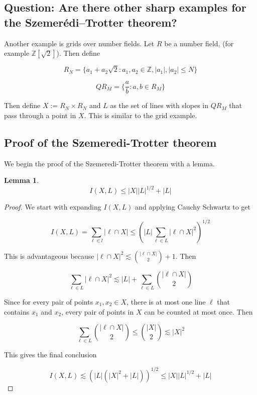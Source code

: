 \documentclass[12pt]{amsart}
\newtheorem{lemma}[theorem]{Lemma}
\begin{document}
\subsection{Question: Are there other sharp examples for the Szemerédi–Trotter theorem?}

Another example is grids over number fields. Let $R$ be a number field, (for example $\mathbb{Z}[\sqrt{2 }]$). Then define 

\[R_N = \{a_1 + a_2 \sqrt{2}: a_1, a_2 \in \mathbb{Z}, |a_1|, |a_2| \leq N\}\]

\[QR_M = \{\frac{a}{b}: a,b \in R_M\}\]

Then define $X:= R_N \times R_N$ and $L$ as the set of lines with slopes in $QR_M$ that pass through a point in $X$. This is similar to the grid example. 

\subsection{Proof of the Szemeredi-Trotter theorem}

We begin the proof of the Szemeredi-Trotter theorem with a lemma. 

\begin{lemma}
\begin{displaymath}
I(X,L) \leq |X| |L|^{1/2} + |L|
\end{displaymath}
\label{weak_bound_ST_lemma}
\end{lemma}
\begin{proof}
We start with expanding $I(X,L)$ and applying Cauchy Schwartz to get 

\[I(X,L) = \sum_{\ell \in l} |\ell \cap X| \leq \left(|L|\sum_{\ell \in L} |\ell \cap X|^2 \right)^{1/2}\]


This is advantageous because $|\ell \cap X|^2 \lesssim \binom{|\ell \cap X|}{ 2} + 1$. Then 

\[\sum_{\ell \in L} |\ell \cap X|^2  \lesssim |L| + \sum_{\ell \in L} \binom{|\ell \cap X|}{2}  \] 

Since for every pair of points $x_1, x_2 \in X$, there is at most one line $\ell$ that contains $x_1$ and $x_2$, every pair of points in $X$ can be counted at most once. Then 

\[ \sum_{\ell \in L} \binom{|\ell \cap X|}{2} \leq \binom{|X|}{2} \lesssim |X|^2\]

This gives the final conclusion 

\[I(X,L) \lesssim \left(|L| (|X|^2 + |L|)\right)^{1/2} \leq |X||L|^{1/2} + |L|\]

\end{proof}
\end{document}
